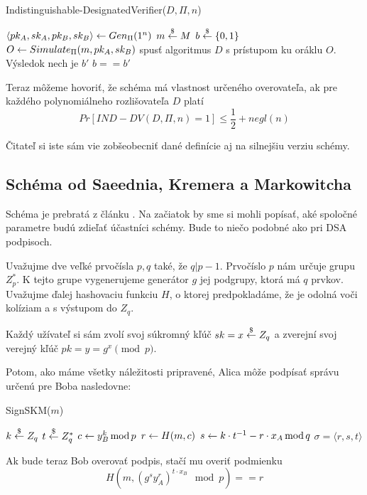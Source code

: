 \begin{procedure}[H]
    \caption{Indistinguishable-DesignatedVerifier($D,\Pi,n$)}
    \label{proc:ind-dv}
    $\langle pk_A,sk_A,pk_B,sk_B \rangle \leftarrow Gen_{\Pi}(1^n)$ \;
    $m \overset{\$}{\leftarrow} M$ \;
    $b \overset{\$}{\leftarrow} \{0,1\}$ \;
        {$O \leftarrow Simulate_\Pi(m,pk_A,sk_B)$}
    spusť algoritmus $D$ s prístupom ku oráklu $O$. Výsledok nech je
    $b'$ \;
    \Return $b==b'$\;
\end{procedure}

Teraz môžeme hovoriť, že schéma má vlastnost určeného overovateľa, ak
pre každého polynomiálneho rozlišovateľa $D$ platí
\begin{equation*}
    Pr[IND-DV(D,\Pi,n)=1] \le \frac{1}{2} + negl(n)
\end{equation*}

Čitateľ si iste sám vie zobšeobecniť dané definície aj na silnejšiu
verziu schémy.

\subsection{Schéma od Saeednia, Kremera a Markowitcha}

Schéma je prebratá z článku \cite{designated_verifier}.
Na začiatok by sme si mohli popísať, aké spoločné parametre budú
zdieľať účastníci schémy. Bude to niečo podobné ako pri DSA podpisoch.

Uvažujme dve veľké prvočísla $p,q$ také, že $q | p-1$. 
Prvočíslo $p$ nám určuje grupu $Z_p^*$.
K tejto grupe vygenerujeme generátor $g$ jej podgrupy, ktorá má $q$
prvkov. Uvažujme ďalej hashovaciu funkciu $H$, o ktorej predpokladáme,
že je odolná voči kolíziam a s výstupom do $Z_q$.

Každý užívateľ si sám zvolí svoj súkromný kľúč $sk=x \overset{\$}{\leftarrow} Z_q$ a
zverejní svoj verejný kľúč $pk=y=g^{x} \pmod{p}$.

Potom, ako máme všetky náležitosti pripravené, Alica môže podpísať
správu určenú pre Boba nasledovne:
\begin{procedure}
    \caption{SignSKM($m$)}
    
    $k \overset{\$}{\leftarrow} Z_q$\;
    $t \overset{\$}{\leftarrow} Z_q^*$\;
    $c \leftarrow y_B^k \,{\rm mod}\,{p}$\;
    $r \leftarrow H(m, c)$\;
    $s \leftarrow k \cdot t^{-1} - r \cdot x_A \,{\rm mod}\,{q}$\;
    \Return $\sigma=\langle r,s,t\rangle$\;
\end{procedure}

Ak bude teraz Bob overovať podpis, stačí mu overiť podmienku
\begin{equation*}
    H(m, (g^s y_A^r)^{t \cdot x_B} \mod{p}) == r
\end{equation*}

